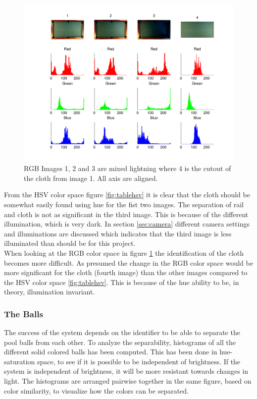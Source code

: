\begin{figure}[H]
\begin{center}
\leavevmode
\includegraphics[width=1\textwidth]{images/rgb_hist_table}
\end{center}
\caption{RGB Images 1, 2 and 3 are mixed lightning where 4 is the cutout of the cloth from image 1. All axis are aligned.}
\label{fig:tablergb}
\end{figure}

From the HSV color space figure \ref{fig:tablehsv} it is clear that the cloth should be somewhat easily found using hue for the fist two images. The separation of rail and cloth is not as significant in the third image. This is because of the different illumination, which is very dark. In section \ref{sec:camera} different camera settings and illuminations are discussed which indicates that the third image is less illuminated than should be for this project.\\

When looking at the RGB color space in figure \ref{fig:tablergb} the identification of the cloth becomes more difficult. As presumed the change in the RGB color space would be more significant for the cloth (fourth image) than the other images compared to the HSV color space \ref{fig:tablehsv}. This is because of the hue ability to be, in theory, illumination invariant.\\

\subsubsection{The Balls}
\label{sec:analballs}
The success of the system depends on the identifier to be able to separate the pool balls from each other. To analyze the separability, histograms of all the different solid colored balls has been computed. This has been done in hue-saturation space, to see if it is possible to be independent of brightness. If the system is independent of brightness, it will be more resistant towards changes in light. The histograms are arranged pairwise together in the same figure, based on color similarity, to visualize how the colors can be separated.


